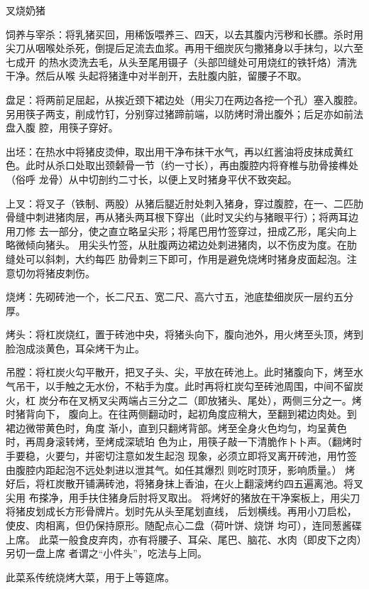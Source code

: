 \begin{recipe}{叉烧奶猪}

\ingredients


\preparation

\step 饲养与宰杀：将乳猪买回，用稀饭喂养三、四天，以去其腹内污秽和长膘。杀时用
尖刀从咽喉处杀死，倒提后足流去血浆。再用干细炭灰匀撒猪身以手抹匀，以六至七成开
的热水烫洗去毛，从头至尾用镊子（头部凹缝处可用烧红的铁钎烙）清洗干净。然后从喉
头起将猪逢中对半剖开，去肚腹内脏，留腰子不取。

\step 盘足：将两前足屈起，从挨近颈下裙边处（用尖刀在两边各挖一个孔）塞入腹腔。
另用筷子两支，削成竹钉，分别穿过猪蹄前端，以防烤时滑出腹外；后足亦如前法盘入腹
腔，用筷子穿好。

\step 出坯：在热水中将猪皮烫伸，取出用干净布抹干水气，再以红酱油将皮抹成黄红
色。此时从杀口处取出颈颡骨一节（约一寸长），再由腹腔内将脊椎与肋骨接榫处（俗呼
龙骨）从中切剖约二寸长，以便上叉时猪身平伏不致突起。

\step 上叉：将叉子（铁制、两股）从猪后腿近肘处刺入猪身，穿过腹腔，在一、二匹肋
骨缝中刺进猪肉层，再从猪头两耳根下穿出（此时叉尖约与猪眼平行）；将两耳边用刀修
去一部分，使之直立略呈尖形；将尾巴用竹签穿过，扭成乙形，尾尖向上略微倾向猪头。
用尖头竹签，从肚腹两边裙边处刺进猪肉，以不伤皮为度。在肋缝处可以斜刺，大约每匹
肋骨刺三下即可，作用是避免烧烤时猪身皮面起泡。注意切勿将猪皮刺伤。

\step 烧烤：先砌砖池一个，长二尺五、宽二尺、高六寸五，池底垫细炭灰一层约五分厚。

\step 烤头：将杠炭烧红，置于砖池中央，将猪头向下，腹向池外，用火烤至头顶，烤到
脸泡成淡黄色，耳朵烤干为止。

\step 吊膛：将杠炭火勾平散开，把叉子头、尖，平放在砖池上。此时猪腹向下，烤至水
气吊干，以手触之无水份，不粘手为度。此时再将杠炭勾至砖池周围，中间不留炭火，杠
炭分布在叉柄叉尖两端占三分之二（即放猪头、尾处），两侧三分之一。烤时猪背向下，
腹向上。在往两侧翻动时，起初角度应稍大，至翻到裙边肉处。到裙边微带黄色时，角度
渐小，直到只翻烤背部。烤至全身火色均匀，均呈黄色时，再周身滚转烤，至烤成深琥珀
色为止，用筷子敲一下清脆作卜卜声。（翻烤时手要稳，火要匀，并密切注意如发生起泡
现象，必须立即将叉离开砖池，用竹签由腹腔内距起泡不远处刺进以泄其气。如任其爆烈
则吃时顶牙，影响质量。）
烤好后，将杠炭散开铺满砖池，将猪身抹上香油，在火上翻滚烤约四五遍离池。将叉尖用
布搽净，用手扶住猪身后肘将叉取出。
将烤好的猪放在干净案板上，用尖刀将猪皮划成长方形骨牌片。划时先从头至尾划直线，
后划横线。再用小刀启松，使皮、肉相离，但仍保持原形。随配点心二盘（荷叶饼、烧饼
均可），连同葱酱碟上席。
此菜一般食皮弃肉，亦有将腰子、耳朵、尾巴、脑花、水肉（即皮下之肉）另切一盘上席
者谓之“小件头”，吃法与上同。

\features

此菜系传统烧烤大菜，用于上等筵席。

\end{recipe}

